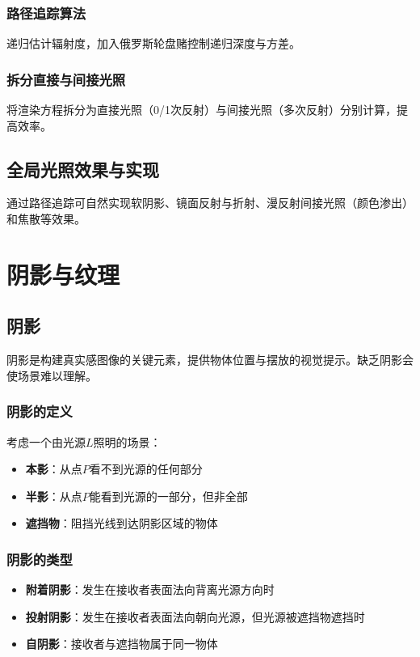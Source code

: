 \documentclass[12pt]{article}
\begin{document}
\subsubsection{路径追踪算法}
递归估计辐射度，加入俄罗斯轮盘赌控制递归深度与方差。

\subsubsection{拆分直接与间接光照}
将渲染方程拆分为直接光照（0/1次反射）与间接光照（多次反射）分别计算，提高效率。

\subsection{全局光照效果与实现}
通过路径追踪可自然实现软阴影、镜面反射与折射、漫反射间接光照（颜色渗出）和焦散等效果。

\newpage

\section{阴影与纹理}

\subsection{阴影}

阴影是构建真实感图像的关键元素，提供物体位置与摆放的视觉提示。缺乏阴影会使场景难以理解。

\subsubsection{阴影的定义}
考虑一个由光源$L$照明的场景：
\begin{itemize}
    \item \textbf{本影}：从点$P$看不到光源的任何部分
    \item \textbf{半影}：从点$P$能看到光源的一部分，但非全部
    \item \textbf{遮挡物}：阻挡光线到达阴影区域的物体
\end{itemize}

\subsubsection{阴影的类型}
\begin{itemize}
    \item \textbf{附着阴影}：发生在接收者表面法向背离光源方向时
    \item \textbf{投射阴影}：发生在接收者表面法向朝向光源，但光源被遮挡物遮挡时
    \item \textbf{自阴影}：接收者与遮挡物属于同一物体
\end{itemize}
\end{document}

